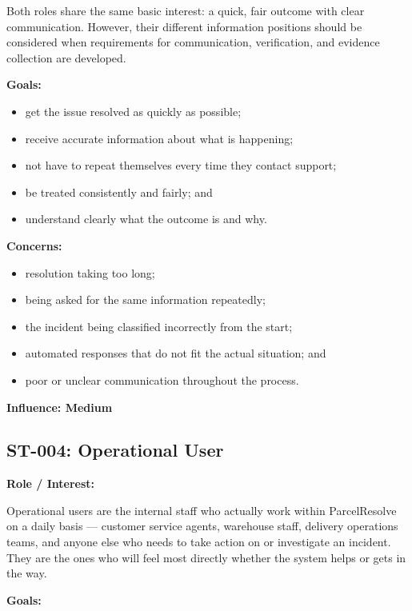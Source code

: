 \documentclass[11pt,a4paper]{article}
\begin{document}
Both roles share the same basic interest: a quick, fair outcome
with clear communication. However, their different information
positions should be considered when requirements for communication,
verification, and evidence collection are developed.

\textbf{Goals:}

\begin{itemize}
    \item get the issue resolved as quickly as possible;
    \item receive accurate information about what is happening;
    \item not have to repeat themselves every time they contact
    support;
    \item be treated consistently and fairly; and
    \item understand clearly what the outcome is and why.
\end{itemize}

\textbf{Concerns:}

\begin{itemize}
    \item resolution taking too long;
    \item being asked for the same information repeatedly;
    \item the incident being classified incorrectly from the start;
    \item automated responses that do not fit the actual situation;
    and
    \item poor or unclear communication throughout the process.
\end{itemize}

\textbf{Influence: Medium}


\subsection{ST-004: Operational User}

\textbf{Role / Interest:}

Operational users are the internal staff who actually work within
ParcelResolve on a daily basis --- customer service agents,
warehouse staff, delivery operations teams, and anyone else who
needs to take action on or investigate an incident. They are the
ones who will feel most directly whether the system helps or
gets in the way.

\textbf{Goals:}
\end{document}
